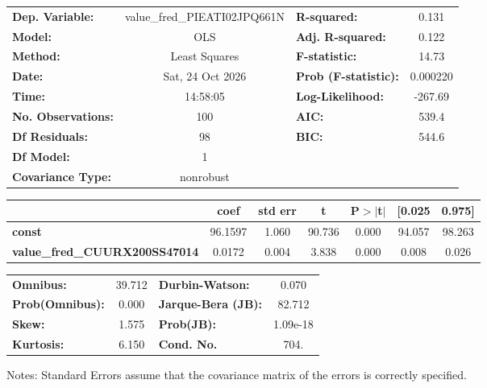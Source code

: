 \begin{center}
\begin{tabular}{lclc}
\toprule
\textbf{Dep. Variable:}               & value\_fred\_PIEATI02JPQ661N & \textbf{  R-squared:         } &     0.131   \\
\textbf{Model:}                       &             OLS              & \textbf{  Adj. R-squared:    } &     0.122   \\
\textbf{Method:}                      &        Least Squares         & \textbf{  F-statistic:       } &     14.73   \\
\textbf{Date:}                        &       Sat, 24 Oct 2026       & \textbf{  Prob (F-statistic):} &  0.000220   \\
\textbf{Time:}                        &           14:58:05           & \textbf{  Log-Likelihood:    } &   -267.69   \\
\textbf{No. Observations:}            &               100            & \textbf{  AIC:               } &     539.4   \\
\textbf{Df Residuals:}                &                98            & \textbf{  BIC:               } &     544.6   \\
\textbf{Df Model:}                    &                 1            & \textbf{                     } &             \\
\textbf{Covariance Type:}             &          nonrobust           & \textbf{                     } &             \\
\bottomrule
\end{tabular}
\begin{tabular}{lcccccc}
                                      & \textbf{coef} & \textbf{std err} & \textbf{t} & \textbf{P$> |$t$|$} & \textbf{[0.025} & \textbf{0.975]}  \\
\midrule
\textbf{const}                        &      96.1597  &        1.060     &    90.736  &         0.000        &       94.057    &       98.263     \\
\textbf{value\_fred\_CUURX200SS47014} &       0.0172  &        0.004     &     3.838  &         0.000        &        0.008    &        0.026     \\
\bottomrule
\end{tabular}
\begin{tabular}{lclc}
\textbf{Omnibus:}       & 39.712 & \textbf{  Durbin-Watson:     } &    0.070  \\
\textbf{Prob(Omnibus):} &  0.000 & \textbf{  Jarque-Bera (JB):  } &   82.712  \\
\textbf{Skew:}          &  1.575 & \textbf{  Prob(JB):          } & 1.09e-18  \\
\textbf{Kurtosis:}      &  6.150 & \textbf{  Cond. No.          } &     704.  \\
\bottomrule
\end{tabular}
\end{center}

Notes: \newline
 [1] Standard Errors assume that the covariance matrix of the errors is correctly specified.